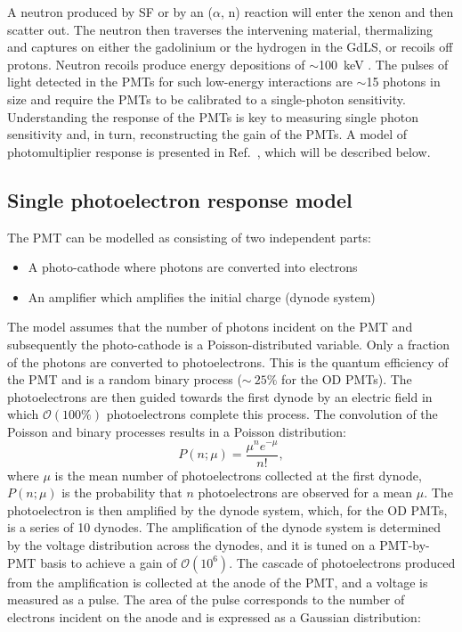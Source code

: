 A neutron produced by SF or by an ($\alpha$, n) reaction will enter the xenon and then scatter out. The neutron then traverses the intervening material, thermalizing and captures on either the gadolinium or the hydrogen in the GdLS, or recoils off protons. Neutron recoils produce energy depositions of $\sim$100~keV \cite{LZNIMA}. The pulses of light detected in the PMTs for such low-energy interactions are $\sim$15 photons in size and require the PMTs to be calibrated to a single-photon sensitivity. Understanding the response of the PMTs is key to measuring single photon sensitivity and, in turn, reconstructing the gain of the PMTs. A model of photomultiplier response is presented in Ref.~\cite{BELLAMY1994468}, which will be described below.
\subsection{Single photoelectron response model}\label{sec:ODComissioning/SPhEResponse}
The PMT can be modelled as consisting of two independent parts:
\begin{itemize}
    \item A photo-cathode where photons are converted into electrons
    \item An amplifier which amplifies the initial charge (dynode system)
\end{itemize}
The model \cite{BELLAMY1994468} assumes that the number of photons incident on the PMT and subsequently the photo-cathode is a Poisson-distributed variable. Only a fraction of the photons are converted to photoelectrons. This is the quantum efficiency of the PMT and is a random binary process ($\sim~25\%$ for the OD PMTs). The photoelectrons are then guided towards the first dynode by an electric field in which $\mathcal{O}(100\%)$ photoelectrons complete this process. The convolution of the Poisson and binary processes results in a Poisson distribution:
\begin{equation}\label{eqn:SPEPoiss}
    P(n;\mu)=\frac{\mu^{n}e^{-\mu}}{n!},
\end{equation}
where $\mu$ is the mean number of photoelectrons collected at the first dynode, $P(n;\mu)$ is the probability that $n$ photoelectrons are observed for a mean $\mu$.
The photoelectron is then amplified by the dynode system, which, for the OD PMTs, is a series of 10 dynodes. The amplification of the dynode system is determined by the voltage distribution across the dynodes, and it is tuned on a PMT-by-PMT basis to achieve a gain of $\mathcal{O}(10^6)$. The cascade of photoelectrons produced from the amplification is collected at the anode of the PMT, and a voltage is measured as a pulse. The area of the pulse corresponds to the number of electrons incident on the anode and is expressed as a Gaussian distribution:
